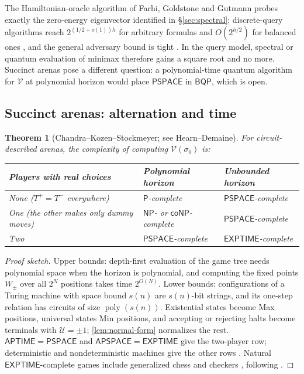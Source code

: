 \documentclass[11pt]{amsart}
\theoremstyle{plain}
\newtheorem{theorem}{Theorem}[section]
\theoremstyle{definition}
\theoremstyle{remark}
\numberwithin{equation}{section}
\newcommand{\val}{\mathcal{V}}            %
\newcommand{\pay}{\mathcal{U}}            %
\newcommand{\poly}{\operatorname{poly}}
\newcommand{\cls}[1]{\mathsf{#1}}
\newcommand{\PSPACE}{\cls{PSPACE}}
\newcommand{\EXPTIME}{\cls{EXPTIME}}
\newcommand{\NP}{\cls{NP}}
\newcommand{\coNP}{\cls{coNP}}
\newcommand{\BQP}{\cls{BQP}}
\newcommand{\Pclass}{\cls{P}}
\begin{document}
The Hamiltonian-oracle algorithm of Farhi, Goldstone and Gutmann \cite{FGG} probes exactly the zero-energy eigenvector identified in \S\ref{sec:spectral}; discrete-query algorithms reach $2^{(1/2+o(1))h}$ for arbitrary formulas \cite{CCJY,ACRSZ} and $O(2^{h/2})$ for balanced ones \cite{ACRSZ}, and the general adversary bound is tight \cite{Reichardt}. In the query model, spectral or quantum evaluation of minimax therefore gains a square root and no more. Succinct arenas pose a different question: a polynomial-time quantum algorithm for $\val$ at polynomial horizon would place $\PSPACE$ in $\BQP$, which is open.

\subsection{Succinct arenas: alternation and time}

\begin{theorem}[Chandra--Kozen--Stockmeyer; see Hearn--Demaine]\label{thm:alternation}
For circuit-described arenas, the complexity of computing $\val(\sigma_0)$ is:
\begin{center}\small
\begin{tabularx}{\linewidth}{@{}>{\raggedright\arraybackslash}Xll@{}}
\toprule
Players with real choices & Polynomial horizon & Unbounded horizon\\ \midrule
None ($T^{+}=T^{-}$ everywhere) & $\Pclass$-complete & $\PSPACE$-complete\\
One (the other makes only dummy moves) & $\NP$- or $\coNP$-complete & $\PSPACE$-complete\\
Two & $\PSPACE$-complete & $\EXPTIME$-complete\\
\bottomrule
\end{tabularx}
\end{center}
\end{theorem}

\begin{proof}[Proof sketch]
Upper bounds: depth-first evaluation of the game tree needs polynomial space when the horizon is polynomial, and computing the fixed points $W_{\pm}$ over all $2^N$ positions takes time $2^{O(N)}$. Lower bounds: configurations of a Turing machine with space bound $s(n)$ are $s(n)$-bit strings, and its one-step relation has circuits of size $\poly(s(n))$. Existential states become Max positions, universal states Min positions, and accepting or rejecting halts become terminals with $\pay=\pm1$; \cref{lem:normal-form} normalizes the rest. $\mathsf{APTIME}=\PSPACE$ and $\mathsf{APSPACE}=\EXPTIME$ \cite{CKS} give the two-player row; deterministic and nondeterministic machines give the other rows \cite{HearnDemaine}. Natural $\EXPTIME$-complete games include generalized chess \cite{FraenkelLichtenstein} and checkers \cite{Robson}, following \cite{StockmeyerChandra}.
\end{proof}
\end{document}
